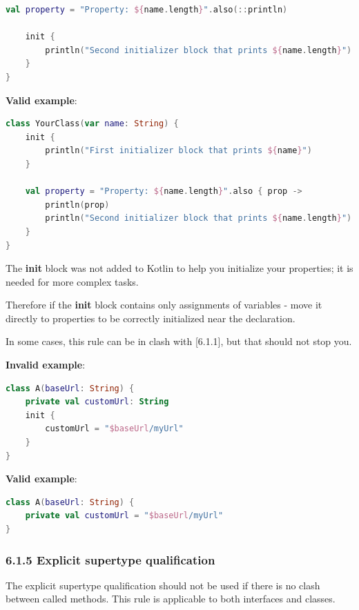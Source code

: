 {{{{{{{{{{{{{{{{{{{{\begin{lstlisting}[language=Kotlin]
    val property = "Property: ${name.length}".also(::println)
    
    init {
        println("Second initializer block that prints ${name.length}")
    }
}
\end{lstlisting}


\textbf{Valid example}:

\begin{lstlisting}[language=Kotlin]
class YourClass(var name: String) {
    init {
        println("First initializer block that prints ${name}")
    }

    val property = "Property: ${name.length}".also { prop ->
        println(prop)
        println("Second initializer block that prints ${name.length}")
    }
}
\end{lstlisting}


The \textbf{init} block was not added to Kotlin to help you initialize your properties; it is needed for more complex tasks. 

Therefore if the \textbf{init} block contains only assignments of variables - move it directly to properties to be correctly initialized near the declaration.

In some cases, this rule can be in clash with [6.1.1], but that should not stop you.



\textbf{Invalid example}:

\begin{lstlisting}[language=Kotlin]
class A(baseUrl: String) {
    private val customUrl: String
    init {
        customUrl = "$baseUrl/myUrl"
    }
}
\end{lstlisting}


\textbf{Valid example}:

\begin{lstlisting}[language=Kotlin]
class A(baseUrl: String) {
    private val customUrl = "$baseUrl/myUrl"
}
\end{lstlisting}


\subsubsection*{\textbf{6.1.5 Explicit supertype qualification}}
\leavevmode\newline

\label{sec:6.1.5}

The explicit supertype qualification should not be used if there is no clash between called methods. This rule is applicable to both interfaces and classes.



}}}}}}}}}}}}}}}}}}}}
